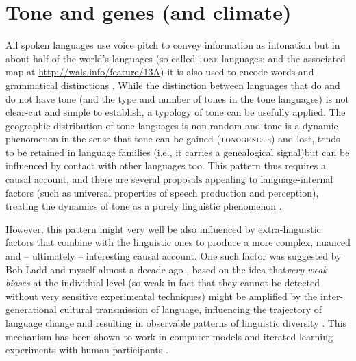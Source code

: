 \documentclass[output=paper]{langsci/langscibook}
\begin{document}
\section{Tone and genes (and climate)}
     
All spoken languages use voice pitch to convey information as intonation \citep{Ladd2008intonation} but in about half of the world's languages (so-called \textsc{tone} languages; \citealt{Maddieson2013b} and the associated map at \url{http://wals.info/feature/13A}) it is also used to encode words and grammatical distinctions \citep{Yip2002}. While the distinction between languages that do and do not have tone (and the type and number of tones in the tone languages) is not clear-cut and simple to establish, a typology of tone can be usefully applied. The geographic distribution of tone languages is non-random \citep{Maddieson2013b} and tone is a dynamic phenomenon in the sense that tone can be gained (\textsc{tonogenesis}) and lost, tends to be retained in language families (i.e., it carries a genealogical signal)but can be influenced by contact with other languages too. This pattern thus requires a causal account, and there are several proposals appealing to language-internal factors (such as universal properties of speech production and perception), treating the dynamics of tone as a purely linguistic phenomenon \citep{Yip2002}.

However, this pattern might very well be also influenced by extra-linguistic factors that combine with the linguistic ones to produce a more complex, nuanced and – ultimately – interesting causal account. One such factor was suggested by Bob Ladd and myself almost a decade ago \citep{Dediu2007}, based on the idea that\textit{very weak biases}  at the individual level (so weak in fact that they cannot be detected without very sensitive experimental techniques) might be amplified by the inter-generational cultural transmission of language, influencing the trajectory of language change and resulting in observable patterns of linguistic diversity \citep{Dediu2011b,Ladd2008intonation}. This mechanism has been shown to work in computer models \citep{Dediu2008,KirbyEtAl2002,Kirby2007} and iterated learning experiments with human participants \citep{Kirby2008,Smith2010}.
\end{document}
